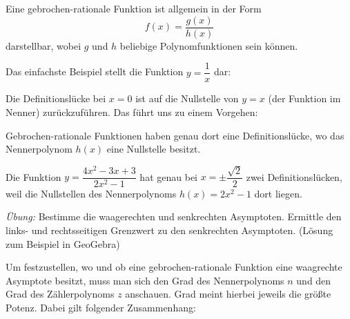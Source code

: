 \documentclass[ngerman, 12pt]{nssheetxea}
\begin{document}
\begin{definition}
Eine gebrochen-rationale Funktion ist allgemein in der Form
\[ f(x)=\dfrac{g(x)}{h(x)} \]
darstellbar, wobei $g$ und $h$ beliebige Polynomfunktionen sein können.
 
\end{definition}

\begin{example}
Das einfachste Beispiel stellt die Funktion $y=\dfrac{1}{x}$ dar:

\begin{center}
\end{center}

\end{example}

Die Definitionslücke bei $x=0$ ist auf die Nullstelle von $y=x$ (der Funktion im Nenner) zurückzuführen. Das führt uns zu einem Vorgehen:

\begin{theorem}

Gebrochen-rationale Funktionen haben genau dort eine Definitionslücke, wo das Nennerpolynom $h(x)$ eine Nullstelle besitzt. 
\end{theorem}

\begin{example}

Die Funktion $y=\dfrac{4x^2-3x+3}{2x^2-1}$ hat genau bei $x=\pm \dfrac{\sqrt{2}}{2}$ zwei Definitionslücken, weil die Nullstellen des Nennerpolynoms $h(x)=2x^2-1$ dort liegen. \par
\textit{Übung:} Bestimme die waagerechten und senkrechten Asymptoten. Ermittle den links- und rechtsseitigen Grenzwert zu den senkrechten Asymptoten. (Lösung zum Beispiel in GeoGebra)

\end{example}

Um festzustellen, wo und ob eine gebrochen-rationale Funktion eine waagrechte Asymptote besitzt, muss man sich den Grad des Nennerpolynoms $n$ und den Grad des Zählerpolynoms $z$ anschauen. Grad meint hierbei jeweils die größte Potenz. Dabei gilt folgender Zusammenhang:
\end{document}
